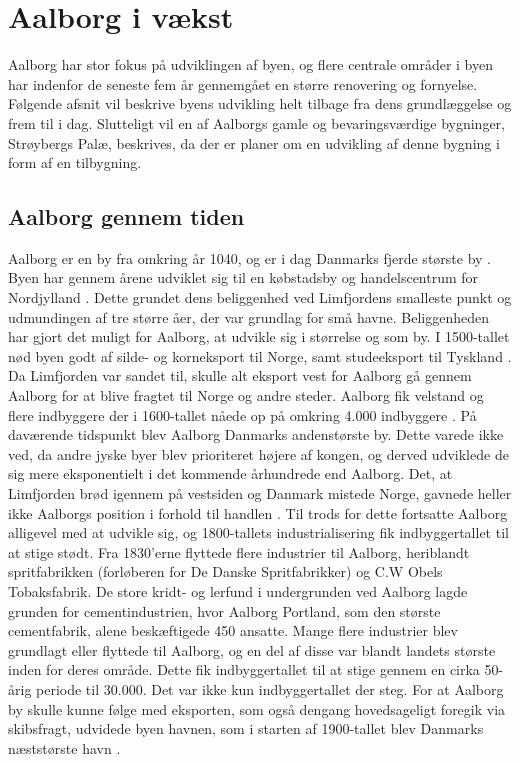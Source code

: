 \chapter{Aalborg i vækst}
Aalborg har stor fokus på udviklingen af byen, og flere centrale områder i byen har indenfor de seneste fem år gennemgået en større renovering og fornyelse. Følgende afsnit vil beskrive byens udvikling helt tilbage fra dens grundlæggelse og frem til i dag. Slutteligt vil en af Aalborgs gamle og bevaringsværdige bygninger, Strøybergs Palæ, beskrives, da der er planer om en udvikling af denne bygning i form af en tilbygning. 

\section{Aalborg gennem tiden}
Aalborg er en by fra omkring år 1040, og er i dag Danmarks fjerde største by \citep{Denstore}. Byen har gennem årene udviklet sig til en købstadsby og handelscentrum for Nordjylland \citep{byhistorie}. Dette grundet dens beliggenhed ved Limfjordens smalleste punkt og udmundingen af tre større åer, der var grundlag for små havne. Beliggenheden har gjort det muligt for Aalborg, at udvikle sig i størrelse og som by. I 1500-tallet nød byen godt af silde- og korneksport til Norge, samt studeeksport til Tyskland \citep{byhistorie}. Da Limfjorden var sandet til, skulle alt eksport vest for Aalborg gå gennem Aalborg for at blive fragtet til Norge og andre steder. Aalborg fik velstand og flere indbyggere der i 1600-tallet nåede op på omkring 4.000 indbyggere \citep{indbyggertal}. På daværende tidspunkt blev Aalborg Danmarks andenstørste by. Dette varede ikke ved, da andre jyske byer blev prioriteret højere af kongen, og derved udviklede de sig mere eksponentielt i det kommende århundrede end Aalborg. Det, at Limfjorden brød igennem på vestsiden og Danmark mistede Norge, gavnede heller ikke Aalborgs position i forhold til handlen \citep{indbyggertal}.
\newline \indent{     }  Til trods for dette fortsatte Aalborg alligevel med at udvikle sig, og 1800-tallets industrialisering fik indbyggertallet til at stige stødt. Fra 1830’erne flyttede flere industrier til Aalborg, heriblandt spritfabrikken (forløberen for De Danske Spritfabrikker) og C.W Obels Tobaksfabrik. De store kridt- og lerfund i undergrunden ved Aalborg lagde grunden for cementindustrien, hvor Aalborg Portland, som den største cementfabrik, alene beskæftigede 450 ansatte. Mange flere industrier blev grundlagt eller flyttede til Aalborg, og en del af disse var blandt landets største inden for deres område. Dette fik indbyggertallet til at stige gennem en cirka 50-årig periode til 30.000. Det var ikke kun indbyggertallet der steg. For at Aalborg by skulle kunne følge med eksporten, som også dengang hovedsageligt foregik via skibsfragt, udvidede byen havnen, som i starten af 1900-tallet blev Danmarks næststørste havn \citep{byhistorie}.
